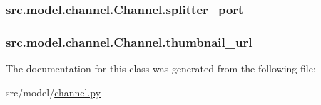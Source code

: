 \subsubsection[{splitter\+\_\+port}]{\setlength{\rightskip}{0pt plus 5cm}src.\+model.\+channel.\+Channel.\+splitter\+\_\+port}\label{classsrc_1_1model_1_1channel_1_1Channel_ac762e1cb64e575b5c379226aea12ff41}
\hypertarget{classsrc_1_1model_1_1channel_1_1Channel_af2ecd4a9abbfaf3a59b4b78ec14cb846}{}
\subsubsection[{thumbnail\+\_\+url}]{\setlength{\rightskip}{0pt plus 5cm}src.\+model.\+channel.\+Channel.\+thumbnail\+\_\+url}\label{classsrc_1_1model_1_1channel_1_1Channel_af2ecd4a9abbfaf3a59b4b78ec14cb846}


The documentation for this class was generated from the following file\+:\begin{DoxyCompactItemize}
\item 
src/model/\hyperlink{channel_8py}{channel.\+py}\end{DoxyCompactItemize}
